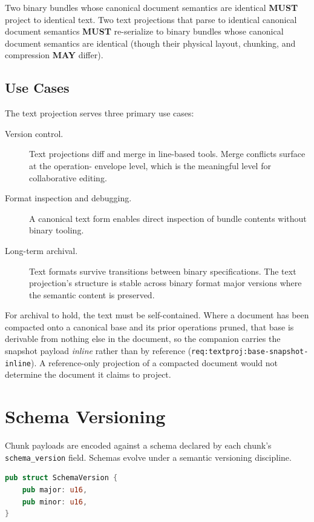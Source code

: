 \documentclass[11pt,letterpaper]{report}
\newcounter{requirement}[chapter]
\newcommand{\MUST}{\textbf{MUST}}
\newcommand{\MAY}{\textbf{MAY}}
\begin{document}
\begin{requirement}
  Two binary bundles whose canonical document semantics are
  identical \MUST{} project to identical text. Two text projections
  that parse to identical canonical document semantics \MUST{}
  re-serialize to binary bundles whose canonical document
  semantics are identical (though their physical layout, chunking,
  and compression \MAY{} differ).
\end{requirement}

\subsection{Use Cases}

The text projection serves three primary use cases:

\begin{description}
  \item[Version control.] Text projections diff and merge in
    line-based tools. Merge conflicts surface at the operation-
    envelope level, which is the meaningful level for collaborative
    editing.
  \item[Format inspection and debugging.] A canonical text form
    enables direct inspection of bundle contents without binary
    tooling.
  \item[Long-term archival.] Text formats survive transitions
    between binary specifications. The text projection's structure
    is stable across binary format major versions where the
    semantic content is preserved.
\end{description}

For archival to hold, the text must be self-contained. Where a document has been
compacted onto a canonical base and its prior operations pruned, that base is
derivable from nothing else in the document, so the companion carries the
snapshot payload \emph{inline} rather than by reference
(\texttt{req:textproj:base-snapshot-inline}). A reference-only projection of a
compacted document would not determine the document it claims to project.

\section{Schema Versioning}
\label{sec:format:schema}

Chunk payloads are encoded against a schema declared by each
chunk's \texttt{schema\_version} field. Schemas evolve under a
semantic versioning discipline.

\begin{lstlisting}[language=Rust]
pub struct SchemaVersion {
    pub major: u16,
    pub minor: u16,
}
\end{lstlisting}
\end{document}
